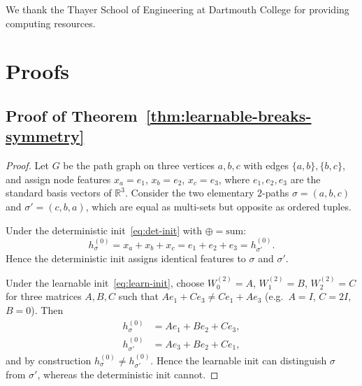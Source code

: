 \documentclass{article}
\begin{document}
\begin{ack}
  We thank the Thayer School of Engineering at Dartmouth College for providing computing resources.
\end{ack}




\appendix

\section{Proofs}
\label{app:proofs}

\subsection{Proof of Theorem~\ref{thm:learnable-breaks-symmetry}}
\label{app:proof-learnable}
\begin{proof}
  Let $G$ be the path graph on three vertices $a, b, c$ with edges $\{a, b\}, \{b, c\}$, and assign node features $x_a = e_1$, $x_b = e_2$, $x_c = e_3$, where $e_1, e_2, e_3$ are the standard basis vectors of $\mathbb{R}^3$. Consider the two elementary $2$-paths $\sigma = (a, b, c)$ and $\sigma' = (c, b, a)$, which are equal as multi-sets but opposite as ordered tuples.

  Under the deterministic init~\eqref{eq:det-init} with $\oplus = \text{sum}$:
  \[
    h_\sigma^{(0)} = x_a + x_b + x_c = e_1 + e_2 + e_3 = h_{\sigma'}^{(0)}.
  \]
  Hence the deterministic init assigns identical features to $\sigma$ and $\sigma'$.

  Under the learnable init~\eqref{eq:learn-init}, choose $W_0^{(2)} = A$, $W_1^{(2)} = B$, $W_2^{(2)} = C$ for three matrices $A, B, C$ such that $A e_1 + C e_3 \neq C e_1 + A e_3$ (e.g.\ $A = I$, $C = 2I$, $B = 0$). Then
  \begin{align*}
    h_\sigma^{(0)}   &= A e_1 + B e_2 + C e_3, \\
    h_{\sigma'}^{(0)} &= A e_3 + B e_2 + C e_1,
  \end{align*}
  and by construction $h_\sigma^{(0)} \neq h_{\sigma'}^{(0)}$. Hence the learnable init can distinguish $\sigma$ from $\sigma'$, whereas the deterministic init cannot.
\end{proof}
\end{document}
